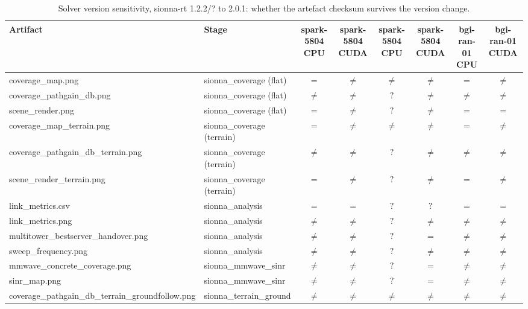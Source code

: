 \begin{table}[t]
  \centering
  \caption{Solver version sensitivity, sionna-rt 1.2.2/? to 2.0.1: whether the artefact checksum survives the version change.}
  \label{tab:versionart}
  \begin{tabular}{llcccccc}
    \toprule
    Artifact & Stage & spark-5804 CPU & spark-5804 CUDA & spark-5804 CPU & spark-5804 CUDA & bgi-ran-01 CPU & bgi-ran-01 CUDA \\
    \midrule
    coverage\_map.png & sionna\_coverage (flat) & $=$ & $\neq$ & $\neq$ & $\neq$ & $=$ & $\neq$ \\
    coverage\_pathgain\_db.png & sionna\_coverage (flat) & $\neq$ & $\neq$ & $?$ & $\neq$ & $\neq$ & $\neq$ \\
    scene\_render.png & sionna\_coverage (flat) & $=$ & $\neq$ & $?$ & $\neq$ & $=$ & $=$ \\
    coverage\_map\_terrain.png & sionna\_coverage (terrain) & $=$ & $\neq$ & $\neq$ & $\neq$ & $=$ & $\neq$ \\
    coverage\_pathgain\_db\_terrain.png & sionna\_coverage (terrain) & $\neq$ & $\neq$ & $?$ & $\neq$ & $\neq$ & $\neq$ \\
    scene\_render\_terrain.png & sionna\_coverage (terrain) & $=$ & $\neq$ & $?$ & $\neq$ & $=$ & $\neq$ \\
    link\_metrics.csv & sionna\_analysis & $=$ & $=$ & $?$ & $?$ & $=$ & $=$ \\
    link\_metrics.png & sionna\_analysis & $\neq$ & $\neq$ & $?$ & $\neq$ & $\neq$ & $\neq$ \\
    multitower\_bestserver\_handover.png & sionna\_analysis & $\neq$ & $\neq$ & $?$ & $=$ & $\neq$ & $\neq$ \\
    sweep\_frequency.png & sionna\_analysis & $\neq$ & $\neq$ & $?$ & $\neq$ & $\neq$ & $\neq$ \\
    mmwave\_concrete\_coverage.png & sionna\_mmwave\_sinr & $\neq$ & $\neq$ & $?$ & $=$ & $\neq$ & $\neq$ \\
    sinr\_map.png & sionna\_mmwave\_sinr & $\neq$ & $\neq$ & $?$ & $=$ & $\neq$ & $\neq$ \\
    coverage\_pathgain\_db\_terrain\_groundfollow.png & sionna\_terrain\_ground & $\neq$ & $\neq$ & $\neq$ & $\neq$ & $\neq$ & $\neq$ \\
    \bottomrule
  \end{tabular}
\end{table}
